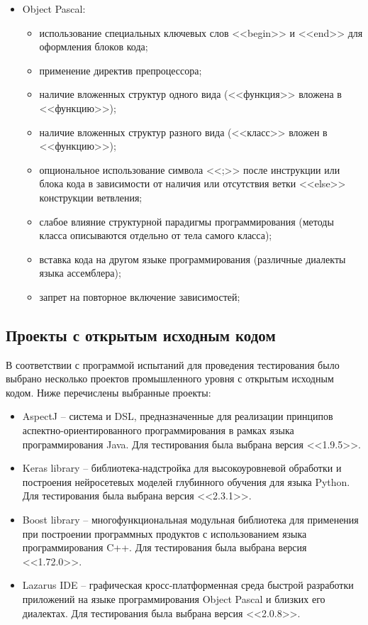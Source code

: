 \begin{itemize}[noitemsep]
  \item Object Pascal:
    \begin{itemize}[noitemsep]
      \item использование специальных ключевых слов <<begin>> и <<end>> для оформления блоков кода;
      \item применение директив препроцессора;
      \item наличие вложенных структур одного вида (<<функция>> вложена в <<функцию>>);
      \item наличие вложенных структур разного вида (<<класс>> вложен в <<функцию>>);
      \item опциональное использование символа <<;>> после инструкции или блока кода в зависимости от наличия или отсутствия ветки <<else>> конструкции ветвления;
      \item слабое влияние структурной парадигмы программирования (методы класса описываются отдельно от тела самого класса);
      \item вставка кода на другом языке программирования (различные диалекты языка ассемблера);
      \item запрет на повторное включение зависимостей;
    \end{itemize}
\end{itemize}

\subsection{Проекты с открытым исходным кодом}

В соответствии с программой испытаний для проведения тестирования было выбрано несколько проектов промышленного уровня с открытым исходным кодом.
Ниже перечислены выбранные проекты:

\begin{itemize}[noitemsep]
  \item AspectJ       \cite{aspectj} --
  система и DSL, предназначенные для реализации принципов аспектно-ориентированного программирования в рамках языка программирования Java.
  Для тестирования была выбрана версия <<1.9.5>>.

  \item Keras library \cite{keras} --
  библиотека-надстройка для высокоуровневой обработки и построения нейросетевых моделей глубинного обучения для языка Python.
  Для тестирования была выбрана версия <<2.3.1>>.

  \item Boost library \cite{boost} --
  многофункциональная модульная библиотека для применения при построении программных продуктов с использованием языка программирования C++.
  Для тестирования была выбрана версия <<1.72.0>>.

  \item Lazarus IDE   \cite{lazarus} --
  графическая кросс-платформенная среда быстрой разработки приложений на языке программирования Object Pascal и близких его диалектах.
  Для тестирования была выбрана версия <<2.0.8>>.
\end{itemize}

